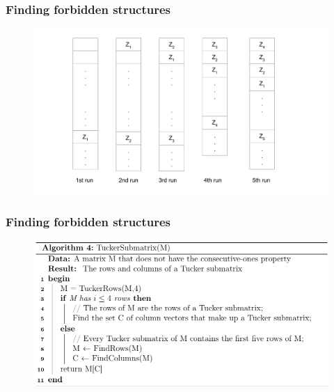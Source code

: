 \documentclass{beamer}
\begin{document}
\begin{frame}
	\frametitle{Finding forbidden structures}
        
	\begin{figure}
		\includegraphics[width = 1\textwidth]{figures/lm_1.pdf}
	\end{figure}
	
\end{frame}

\begin{frame}
	\frametitle{Finding forbidden structures}
        
	\begin{figure}
		\includegraphics[width = 1\textwidth]{figures/FSalgo.png}
	\end{figure}
	
\end{frame}
\end{document}
